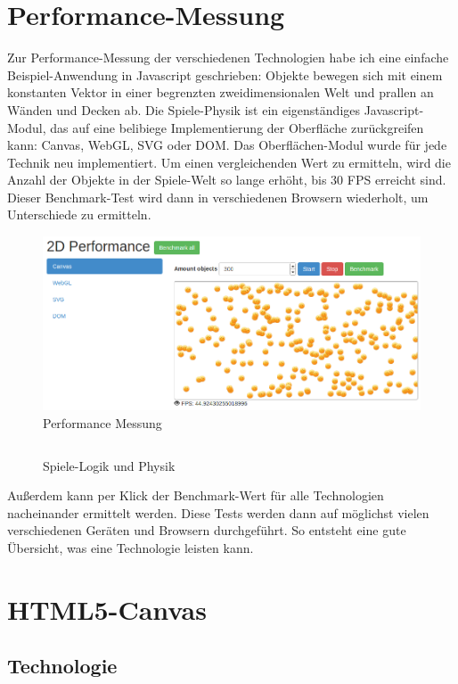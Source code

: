 \documentclass[a4paper, 12pt]{article}
\begin{document}
\section{Performance-Messung}
Zur Performance-Messung der verschiedenen Technologien habe ich eine einfache Beispiel-Anwendung in Javascript geschrieben: Objekte bewegen sich mit einem konstanten Vektor in einer begrenzten zweidimensionalen Welt und prallen an Wänden und Decken ab. Die Spiele-Physik ist ein eigenständiges Javascript-Modul, das auf eine belibiege Implementierung der Oberfläche zurückgreifen kann: Canvas, WebGL, SVG oder DOM. Das Oberflächen-Modul wurde für jede Technik neu implementiert. Um einen vergleichenden Wert zu ermitteln, wird die Anzahl der Objekte in der Spiele-Welt so lange erhöht, bis 30 FPS erreicht sind. Dieser Benchmark-Test wird dann in verschiedenen Browsern wiederholt, um Unterschiede zu ermitteln.
\begin{figure}[h!]
	\begin{center}
		\includegraphics[width=\textwidth]{assets/demo_screenshot.png} 
	\end{center}
	\caption{Performance Messung}
	\label{performance_benchmark}
\end{figure}
\begin{figure}[h!]
	\inputminted{javascript}{assets/benchmark1.js}
	\caption{Spiele-Logik und Physik}
	\label{benchmark1}
\end{figure}
Außerdem kann per Klick der Benchmark-Wert für alle Technologien nacheinander ermittelt werden. Diese Tests werden dann auf möglichst vielen verschiedenen Geräten und Browsern durchgeführt. So entsteht eine gute Übersicht, was eine Technologie leisten kann.
\section{HTML5-Canvas}
\subsection{Technologie}
\end{document}
